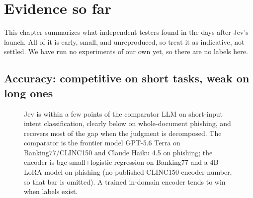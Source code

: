 \chapter{Evidence so far}
\label{ch:evidence}

This chapter summarizes what independent testers found in the days after Jev's launch. All of
it is early, small, and unreproduced, so treat it as indicative, not settled. We have run no
experiments of our own yet, so there are no \MEAS{} labels here.

\section{Accuracy: competitive on short tasks, weak on long ones}

\begin{figure}[h]\centering
{}
\caption{Jev is within a few points of the comparator LLM on short-input intent
classification, clearly below on whole-document phishing, and recovers most of the gap when
the judgment is decomposed. The comparator is the frontier model GPT-5.6 Terra on
Banking77/CLINC150 and Claude Haiku 4.5 on phishing; the encoder is bge-small+logistic
regression on Banking77 and a 4B LoRA model on phishing (no published CLINC150 encoder
number, so that bar is omitted). A trained in-domain encoder tends to win when labels
exist.~\citep{jev_baselines_eval,jev_phishing_bench}}
\label{fig:accuracy}
\end{figure}

